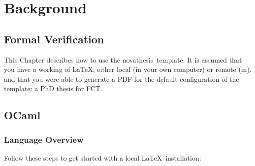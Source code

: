 
%

\chapter{Background}
\label{cha:background}

\glsresetall

\begin{center}
\end{center}


\section{Formal Verification}
\label{sec:formal_verification}

This Chapter describes how to use the \gls{novathesis}\ template.  It is assumed that you have a working  of \LaTeX, either local (in your own computer) or remote (in), and that you were able to generate a PDF for the default configuration of the template: a PhD thesis for \gls{FCT}.


\section{OCaml}
\label{sec:ocaml}

\subsection{Language Overview} %
\label{sub:language_overview}

Follow these steps to get started with a local \LaTeX\ installation:

